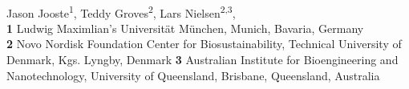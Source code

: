\documentclass[10pt,letterpaper]{article}
\begin{document}
\vspace*{0.2in}

\begin{flushleft}
{\Large
\textbf{} %
}
\newline
\\
Jason Jooste\textsuperscript{1},
Teddy Groves\textsuperscript{2},
Lars Nielsen\textsuperscript{2,3},
\\
\bigskip
\textbf{1} Ludwig Maximlian's Universität München, Munich, Bavaria, Germany
\\
\textbf{2} Novo Nordisk Foundation Center for Biosustainability, Technical University of Denmark, Kgs. Lyngby, Denmark
\textbf{3} Australian Institute for Bioengineering and Nanotechnology, University of Queensland, Brisbane, Queensland, Australia
\bigskip

%
%






\end{flushleft}
\end{document}
